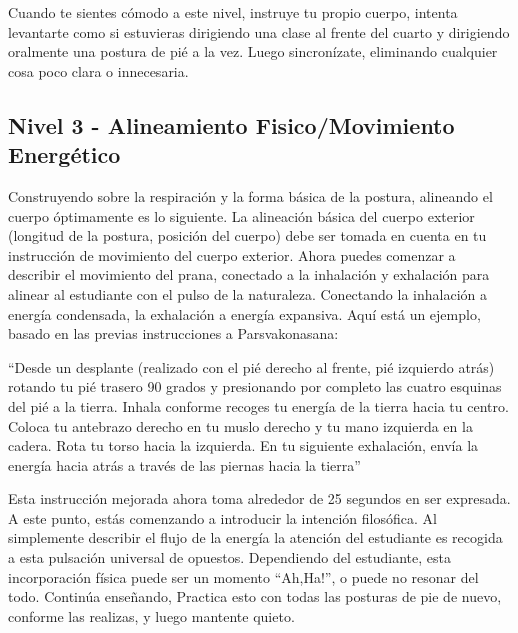 Cuando te sientes cómodo a este nivel, instruye tu propio cuerpo, intenta levantarte como si estuvieras dirigiendo una clase al frente del cuarto y dirigiendo oralmente una postura de pi\'e a la vez. Luego sincronízate, eliminando cualquier cosa poco clara o innecesaria.

\subsection{Nivel 3 - Alineamiento Fisico/Movimiento Energético}
Construyendo sobre la respiración y la forma básica de la postura, alineando el cuerpo óptimamente es lo siguiente. La alineación básica del cuerpo exterior (longitud de la postura, posición del cuerpo) debe ser tomada en cuenta en tu instrucción de movimiento del cuerpo exterior. Ahora puedes comenzar a describir el movimiento del prana, conectado a la inhalación y exhalación para alinear al estudiante con el pulso de la naturaleza. Conectando la inhalación a energía condensada, la exhalación a energía expansiva. Aquí está un ejemplo, basado en las previas instrucciones a Parsvakonasana:

``Desde un desplante (realizado con el pi\'e derecho al frente, pi\'e izquierdo atrás) rotando tu pi\'e trasero 90 grados y presionando por completo las cuatro esquinas del pi\'e a la tierra. Inhala conforme recoges tu energía de la tierra hacia tu centro. Coloca tu antebrazo derecho en tu muslo derecho y tu mano izquierda en la cadera. Rota tu torso hacia la izquierda. En tu siguiente exhalación, envía la energía hacia atrás a trav\'es de las piernas hacia la tierra''

Esta instrucción mejorada ahora toma alrededor de 25 segundos en ser expresada. A este punto, estás comenzando a introducir la intención filosófica. Al simplemente describir el flujo de la energía la atención del estudiante es recogida a esta pulsación universal de opuestos. Dependiendo del estudiante, esta incorporación física puede ser un momento ``Ah,Ha!'', o puede no resonar del todo. Continúa enseñando, Practica esto con todas las posturas de pie de nuevo, conforme las realizas, y luego mantente quieto.


